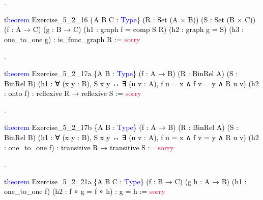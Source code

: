 \documentclass[
  letterpaper,
  DIV=11,
  numbers=noendperiod]{scrreprt}
\newenvironment{Shaded}{\begin{snugshade}}{\end{snugshade}}
\newcommand{\ConstantTok}[1]{\textcolor[rgb]{0.56,0.35,0.01}{#1}}
\newcommand{\KeywordTok}[1]{\textcolor[rgb]{0.00,0.23,0.31}{#1}}
\newcommand{\NormalTok}[1]{\textcolor[rgb]{0.00,0.23,0.31}{#1}}
\renewcommand{\NormalTok}[1]{\textcolor[HTML]{000000}{#1}}
\renewcommand{\KeywordTok}[1]{\textcolor[HTML]{0000FF}{#1}}
\renewcommand{\ConstantTok}[1]{\textcolor[HTML]{DC143C}{#1}}
\newcommand{\nobreakShaded}{\renewenvironment{Shaded}
	{\begin{tcolorbox}[frame hidden, enhanced, interior hidden, boxrule=0pt,
		borderline west={3pt}{0pt}{shadecolor}, sharp corners]}
	{\end{tcolorbox}}}
\newenvironment{numex}[1]
	{\begin{minipage}[t]{0.04\textwidth}\vspace{8pt}{#1}.
		\end{minipage}\nobreakShaded\begin{minipage}[t]{0.96\textwidth}\vspace{0pt}}
	{\end{minipage}}
\theoremstyle{remark}
\begin{document}
\begin{numex}{6}

\begin{Shaded}
\begin{Highlighting}[]
\KeywordTok{theorem}\NormalTok{ Exercise\_5\_2\_16 \{A B C : }\KeywordTok{Type}\NormalTok{\}}
\NormalTok{    (R : Set (A × B)) (S : Set (B × C)) (f : A → C) (g : B → C)}
\NormalTok{    (h1 : graph f = comp S R) (h2 : graph g = S) (h3 : one\_to\_one g) :}
\NormalTok{    is\_func\_graph R := }\ConstantTok{sorry}
\end{Highlighting}
\end{Shaded}

\end{numex}

\begin{numex}{7}

\begin{Shaded}
\begin{Highlighting}[]
\KeywordTok{theorem}\NormalTok{ Exercise\_5\_2\_17a}
\NormalTok{    \{A B : }\KeywordTok{Type}\NormalTok{\} (f : A → B) (R : BinRel A) (S : BinRel B)}
\NormalTok{    (h1 : ∀ (x y : B), S x y ↔ ∃ (u v : A), f u = x ∧ f v = y ∧ R u v)}
\NormalTok{    (h2 : onto f) : reflexive R → reflexive S := }\ConstantTok{sorry}
\end{Highlighting}
\end{Shaded}

\end{numex}

\begin{numex}{8}

\begin{Shaded}
\begin{Highlighting}[]
\KeywordTok{theorem}\NormalTok{ Exercise\_5\_2\_17b}
\NormalTok{    \{A B : }\KeywordTok{Type}\NormalTok{\} (f : A → B) (R : BinRel A) (S : BinRel B)}
\NormalTok{    (h1 : ∀ (x y : B), S x y ↔ ∃ (u v : A), f u = x ∧ f v = y ∧ R u v)}
\NormalTok{    (h2 : one\_to\_one f) : transitive R → transitive S := }\ConstantTok{sorry}
\end{Highlighting}
\end{Shaded}

\end{numex}

\begin{numex}{9}

\begin{Shaded}
\begin{Highlighting}[]
\KeywordTok{theorem}\NormalTok{ Exercise\_5\_2\_21a \{A B C : }\KeywordTok{Type}\NormalTok{\} (f : B → C) (g h : A → B)}
\NormalTok{    (h1 : one\_to\_one f) (h2 : f ∘ g = f ∘ h) : g = h := }\ConstantTok{sorry}
\end{Highlighting}
\end{Shaded}

\end{numex}
\end{document}
